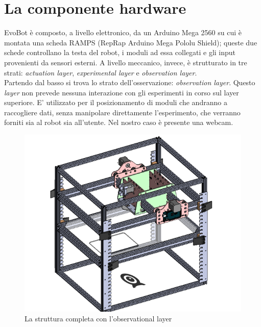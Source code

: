 \section{La componente hardware}
EvoBot è composto, a livello elettronico, da un Arduino Mega 2560 su cui è montata una scheda RAMPS (RepRap Arduino Mega Pololu Shield); queste due schede controllano la testa del robot, i moduli ad essa collegati e gli input provenienti da sensori esterni. 
A livello meccanico, invece, è strutturato in tre strati: \emph{actuation layer}, \emph{experimental layer} e  \emph{observation layer}.
\\Partendo dal basso si trova lo strato dell'osservazione: \emph{observation layer}. Questo \emph{layer} non prevede nessuna interazione con gli esperimenti in corso sul layer superiore. E' utilizzato per il posizionamento di moduli che andranno a raccogliere dati, senza manipolare direttamente l'esperimento, che verranno forniti sia al robot sia all'utente. Nel nostro caso è presente una webcam. 
	\begin{figure}[h]
	  \includegraphics[scale=0.40]{immagini/observational-layer.png}
	\centering
	 \caption{La struttura completa con l'observational layer}
	\end{figure} 

